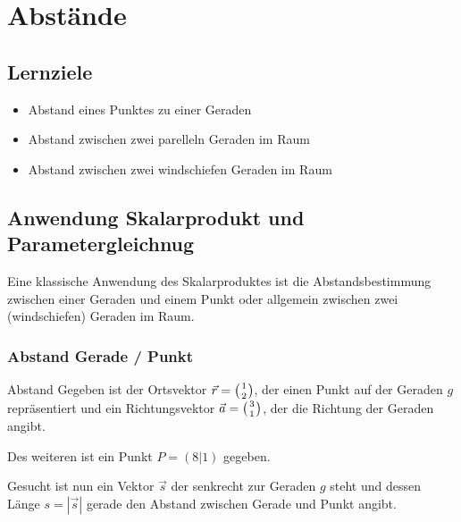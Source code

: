 \section{Abstände}

\subsection*{Lernziele}
\begin{itemize}
  \item Abstand eines Punktes zu einer Geraden
\item Abstand zwischen zwei parelleln Geraden im Raum
\item Abstand zwischen zwei windschiefen Geraden im Raum
\end{itemize}

\newpage

\subsection{Anwendung Skalarprodukt und Parametergleichnug}

Eine klassische Anwendung des Skalarproduktes ist die
Abstandsbestimmung zwischen einer Geraden und einem Punkt oder
allgemein zwischen zwei (windschiefen) Geraden im Raum.
\newpage

\subsubsection{Abstand Gerade / Punkt}

\begin{beispiel}{Abstand}{}
Gegeben ist der Ortsvektor $\vec{r}=\left(1 \atop 2\right)$, der einen Punkt auf der
Geraden $g$ repräsentiert und ein Richtungsvektor
$\vec{a}=\left(3\atop 1\right)$, der
die Richtung der Geraden angibt.

Des weiteren ist ein Punkt $P=(8|1)$ gegeben.

Gesucht ist nun ein Vektor
$\vec{s}$ der senkrecht zur Geraden $g$ steht und dessen Länge
$s=|\vec{s}|$ gerade den Abstand zwischen Gerade und Punkt angibt.
\end{beispiel}

